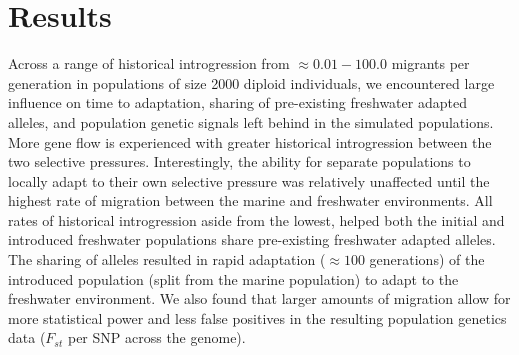 \documentclass{article}
\newcommand{\plr}[1]{\todo[linecolor=blue,backgroundcolor=blue!25,bordercolor=blue]{#1}}
\begin{document}



\section{Results}

Across a range of historical introgression from $\approx 0.01 - 100.0$ migrants per generation in populations of 
size 2000 diploid individuals, we encountered large influence on 
time to adaptation,
sharing of pre-existing freshwater adapted alleles,
and population genetic signals left behind in the simulated populations.
More gene flow is experienced with greater historical introgression between the two selective pressures.
Interestingly, the ability for separate populations to locally adapt to their own selective pressure was relatively unaffected 
until the highest rate of migration between the marine and freshwater environments.
All rates of historical introgression aside from the lowest, helped both the initial and introduced freshwater populations 
share pre-existing freshwater adapted alleles.
The sharing of alleles resulted in rapid adaptation ($\approx 100$ generations) of the introduced population (split from the marine population) to adapt to the freshwater environment.
We also found that larger amounts of migration allow for more statistical power and less false positives in the resulting population genetics data ($F_{st}$ per SNP across the genome).
\end{document}
